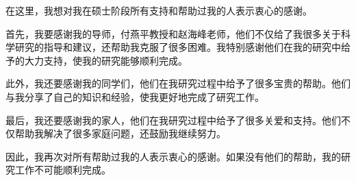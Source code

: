 \acknowledgments

在这里，我想对我在硕士阶段所有支持和帮助过我的人表示衷心的感谢。\par

首先，我要感谢我的导师，付燕平教授和赵海峰老师，他们不仅给了我很多关于科学研究的指导和建议，还帮助我克服了很多困难。我特别感谢他们在我的研究中给予的大力支持，使我的研究能够顺利完成。

此外，我还要感谢我的同学们，他们在我研究过程中给予了很多宝贵的帮助。他们与我分享了自己的知识和经验，使我更好地完成了研究工作。

最后，我还要感谢我的家人，他们在我研究过程中给予了很多关爱和支持。他们不仅帮助我解决了很多家庭问题，还鼓励我继续努力。

因此，我再次对所有帮助过我的人表示衷心的感谢。如果没有他们的帮助，我的研究工作不可能顺利完成。
\par 